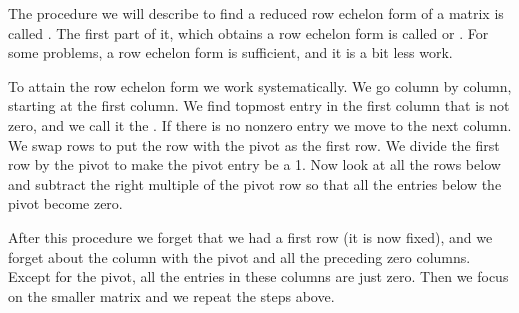 The procedure we will describe to find a reduced row echelon form
of a matrix
is called \emph{}.
The first part of it, which obtains a row echelon form is called 
\emph{} or
\emph{}.  For some problems, a row echelon
form is sufficient, and it is a bit less work.

To attain the row echelon form we work systematically.
We go column by column, starting at the first column.  We find topmost
entry in the first column that is not zero, and we call it the
\emph{}.  If there is no nonzero entry
we move to the next column.  We swap rows to put the row with
the pivot as the first row.  We divide the first row
by the pivot to make the pivot entry be a 1.  Now look at all the rows below
and subtract the right multiple of the pivot row so that all the entries
below the pivot become zero.

After this procedure we forget that we had a first row (it is now fixed),
and we forget about the column with the pivot and all the preceding zero
columns.
Except for the pivot, all the entries in these columns are just
zero.  Then we focus on the smaller matrix and we repeat the steps
above.

